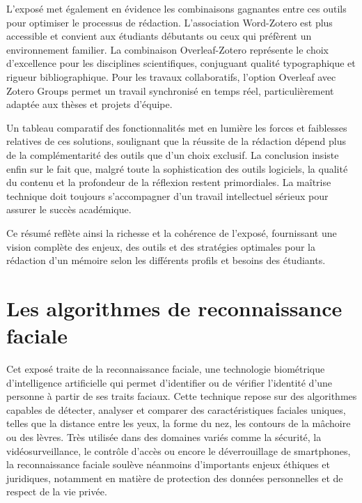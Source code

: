 \documentclass[11pt,a4paper]{article}
\begin{document}
	L’exposé met également en évidence les combinaisons gagnantes entre ces outils pour optimiser le processus de rédaction. L’association Word-Zotero est plus accessible et convient aux étudiants débutants ou ceux qui préfèrent un environnement familier. La combinaison Overleaf-Zotero représente le choix d’excellence pour les disciplines scientifiques, conjuguant qualité typographique et rigueur bibliographique. Pour les travaux collaboratifs, l’option Overleaf avec Zotero Groups permet un travail synchronisé en temps réel, particulièrement adaptée aux thèses et projets d’équipe.
	
	Un tableau comparatif des fonctionnalités met en lumière les forces et faiblesses relatives de ces solutions, soulignant que la réussite de la rédaction dépend plus de la complémentarité des outils que d’un choix exclusif. La conclusion insiste enfin sur le fait que, malgré toute la sophistication des outils logiciels, la qualité du contenu et la profondeur de la réflexion restent primordiales. La maîtrise technique doit toujours s’accompagner d’un travail intellectuel sérieux pour assurer le succès académique.
	
	Ce résumé reflète ainsi la richesse et la cohérence de l’exposé, fournissant une vision complète des enjeux, des outils et des stratégies optimales pour la rédaction d’un mémoire selon les différents profils et besoins des étudiants.
	
	
	
	\section{ Les algorithmes de reconnaissance
		faciale}
	\vspace{0.5cm}
	Cet exposé traite de la reconnaissance faciale, une technologie biométrique d’intelligence artificielle qui permet d’identifier ou de vérifier l’identité d’une personne à partir de ses traits faciaux. Cette technique repose sur des algorithmes capables de détecter, analyser et comparer des caractéristiques faciales uniques, telles que la distance entre les yeux, la forme du nez, les contours de la mâchoire ou des lèvres. Très utilisée dans des domaines variés comme la sécurité, la vidéosurveillance, le contrôle d’accès ou encore le déverrouillage de smartphones, la reconnaissance faciale soulève néanmoins d’importants enjeux éthiques et juridiques, notamment en matière de protection des données personnelles et de respect de la vie privée.
	
\end{document}
